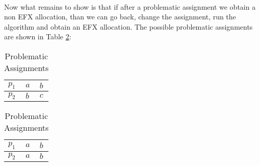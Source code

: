\documentclass{article}
\begin{document}
\paragraph{}
Now what remains to show is that if after a problematic assignment we obtain a non EFX allocation, than we can go back, change the assignment, run the algorithm and obtain an EFX allocation. 
The possible problematic assignments are shown in Table \ref{table:problematic-assignments-2-players}:
\begin{table}[h]
    \footnotesize
 
        \centering
       \begin{tabular}{|l|l|l|}
            \hline
            $p_1$ & $a$ & $b$ \\ \hline
            $p_2$ & $b$ & $c$ \\ \hline
        \end{tabular}
\centering
        \begin{tabular}{|l|l|l|}
            \hline
            $p_1$ & $a$ & $b$ \\ \hline
            $p_2$ & $a$ & $b$ \\ \hline
        \end{tabular}
        
        \caption{Problematic Assignments}
        \label{table:problematic-assignments-2-players}
    \end{table}
\end{document}
